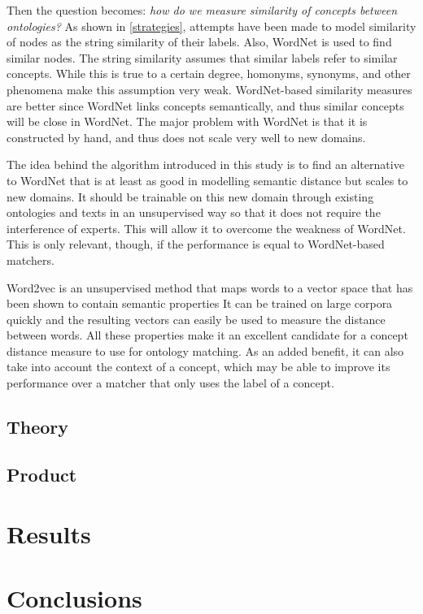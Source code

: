 \documentclass{article}
\begin{document}
 Then the question becomes: \textit{how do we measure similarity of concepts between ontologies?} As shown in \ref{strategies}, attempts have been made to model similarity of nodes as the string similarity of their labels. Also, WordNet is used to find similar nodes. The string similarity assumes that similar labels refer to similar concepts. While this is true to a certain degree, homonyms, synonyms, and other phenomena make this assumption very weak. WordNet-based similarity measures are better since WordNet links concepts semantically, and thus similar concepts will be close in WordNet. The major problem with WordNet is that it is constructed by hand, and thus does not scale very well to new domains.
 
 The idea behind the algorithm introduced in this study is to find an alternative to WordNet that is at least as good in modelling semantic distance but scales to new domains. It should be trainable on this new domain through existing ontologies and texts in an unsupervised way so that it does not require the interference of experts. This will allow it to overcome the weakness of WordNet. This is only relevant, though, if the performance is equal to WordNet-based matchers.
 
 Word2vec is an unsupervised method that maps words to a vector space that has been shown to contain semantic properties %
 It can be trained on large corpora quickly and the resulting vectors can easily be used to measure the distance between words. All these properties make it an excellent candidate for a concept distance measure to use for ontology matching. As an added benefit, it can also take into account the context of a concept, which may be able to improve its performance over a matcher that only uses the label of a concept.
 \subsection{Theory}
 
 \subsection{Product}
 
 \section{Results} \label{results}
 
 \section{Conclusions}
\end{document}
